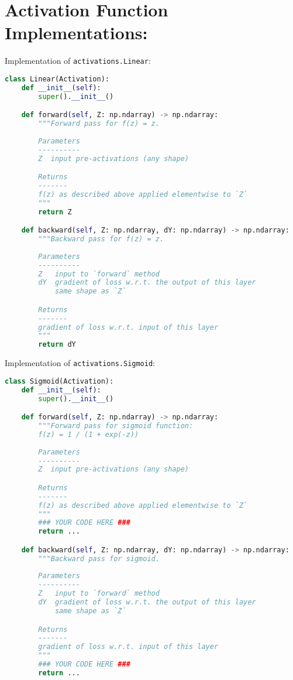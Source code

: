 \section{Activation Function Implementations:}

Implementation of \texttt{activations.Linear}:

\begin{lstlisting}[language=Python]
class Linear(Activation):
    def __init__(self):
        super().__init__()

    def forward(self, Z: np.ndarray) -> np.ndarray:
        """Forward pass for f(z) = z.
        
        Parameters
        ----------
        Z  input pre-activations (any shape)

        Returns
        -------
        f(z) as described above applied elementwise to `Z`
        """
        return Z

    def backward(self, Z: np.ndarray, dY: np.ndarray) -> np.ndarray:
        """Backward pass for f(z) = z.
        
        Parameters
        ----------
        Z   input to `forward` method
        dY  gradient of loss w.r.t. the output of this layer
            same shape as `Z`

        Returns
        -------
        gradient of loss w.r.t. input of this layer
        """
        return dY

\end{lstlisting}

Implementation of \texttt{activations.Sigmoid}:

\begin{lstlisting}[language=Python]
class Sigmoid(Activation):
    def __init__(self):
        super().__init__()

    def forward(self, Z: np.ndarray) -> np.ndarray:
        """Forward pass for sigmoid function:
        f(z) = 1 / (1 + exp(-z))
        
        Parameters
        ----------
        Z  input pre-activations (any shape)

        Returns
        -------
        f(z) as described above applied elementwise to `Z`
        """
        ### YOUR CODE HERE ###
        return ...

    def backward(self, Z: np.ndarray, dY: np.ndarray) -> np.ndarray:
        """Backward pass for sigmoid.
        
        Parameters
        ----------
        Z   input to `forward` method
        dY  gradient of loss w.r.t. the output of this layer
            same shape as `Z`

        Returns
        -------
        gradient of loss w.r.t. input of this layer
        """
        ### YOUR CODE HERE ###
        return ...

\end{lstlisting}

